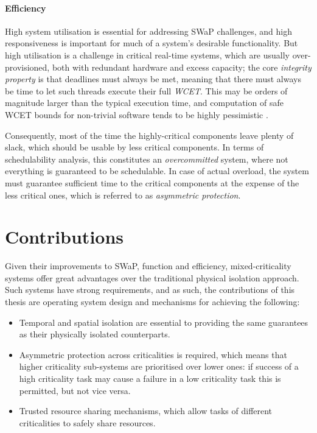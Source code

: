 

\paragraph{Efficiency}
High system utilisation is essential for addressing SWaP challenges, and high responsiveness is
important for much of a system's desirable functionality. But high utilisation is a challenge in
critical real-time systems, which are usually over-provisioned, both with redundant hardware and 
excess capacity; the core \emph{integrity property} is that deadlines must always be
met, meaning that there must always be time to let such threads execute their full \emph{\gls{WCET}}.
This may be orders of magnitude larger than the typical execution time, and
computation of safe \gls{WCET} bounds for non-trivial software tends to be highly pessimistic
\citep{Wilhelm_EEHTWBFHMMPPSS_08}.  

Consequently, most of the time the highly-critical components
leave plenty of slack, which should be usable by less critical components. In terms of
schedulability analysis, this constitutes an \emph{overcommitted} system, where not everything is
guaranteed to be schedulable.  In case of actual overload, the system must guarantee sufficient time
to the critical components at the expense of the less critical ones, which is referred to as
\emph{asymmetric protection}.

\section{Contributions}

Given their improvements to \gls{SWaP}, function and efficiency, mixed-criticality systems offer
great advantages over the traditional physical isolation approach. 
Such systems have strong requirements, and as such, the contributions of this thesis are operating
system design and mechanisms for achieving the following:

\begin{itemize}
    \item Temporal and spatial isolation are essential to providing the same guarantees as their
physically isolated counterparts. 
    \item Asymmetric protection across criticalities is required,
    which means that higher criticality sub-systems are prioritised over lower ones: if success of a
    high criticality task may cause a failure in a low criticality task this is permitted, but not
    vice versa.
    \item Trusted resource sharing mechanisms, which allow tasks of different criticalities to 
        safely share resources.
\end{itemize}

